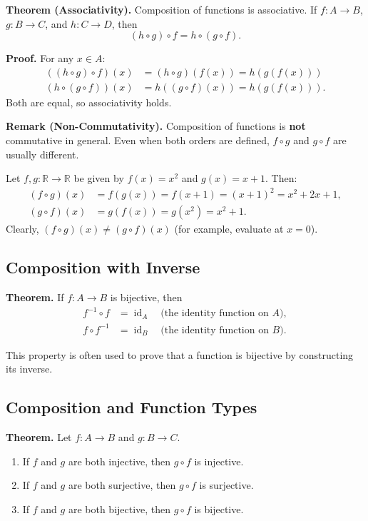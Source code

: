 \documentclass[11pt,a4paper]{article}
\begin{document}
\textbf{Theorem (Associativity).} Composition of functions is associative. If $f: A \to B$, $g: B \to C$, and $h: C \to D$, then
\begin{equation*}
    (h \circ g) \circ f = h \circ (g \circ f).
\end{equation*}

\textbf{Proof.} For any $x \in A$:
\begin{align*}
    ((h \circ g) \circ f)(x) &= (h \circ g)(f(x)) = h(g(f(x))) \\
    (h \circ (g \circ f))(x) &= h((g \circ f)(x)) = h(g(f(x))).
\end{align*}
Both are equal, so associativity holds.

\textbf{Remark (Non-Commutativity).} Composition of functions is \textbf{not} commutative in general. Even when both orders are defined, $f \circ g$ and $g \circ f$ are usually different.

\begin{example}
Let $f, g: \mathbb{R} \to \mathbb{R}$ be given by $f(x) = x^2$ and $g(x) = x + 1$. Then:
\begin{align*}
    (f \circ g)(x) &= f(g(x)) = f(x+1) = (x+1)^2 = x^2 + 2x + 1, \\
    (g \circ f)(x) &= g(f(x)) = g(x^2) = x^2 + 1.
\end{align*}
Clearly, $(f \circ g)(x) \neq (g \circ f)(x)$ (for example, evaluate at $x = 0$).
\end{example}

\subsection{Composition with Inverse}

\textbf{Theorem.} If $f: A \to B$ is bijective, then
\begin{align*}
    f^{-1} \circ f &= \operatorname{id}_A \quad \text{(the identity function on } A\text{)}, \\
    f \circ f^{-1} &= \operatorname{id}_B \quad \text{(the identity function on } B\text{)}.
\end{align*}

This property is often used to prove that a function is bijective by constructing its inverse.

\subsection{Composition and Function Types}

\textbf{Theorem.} Let $f: A \to B$ and $g: B \to C$.
\begin{enumerate}[label=(\roman*)]
    \item If $f$ and $g$ are both injective, then $g \circ f$ is injective.
    \item If $f$ and $g$ are both surjective, then $g \circ f$ is surjective.
    \item If $f$ and $g$ are both bijective, then $g \circ f$ is bijective.
\end{enumerate}
\end{document}
